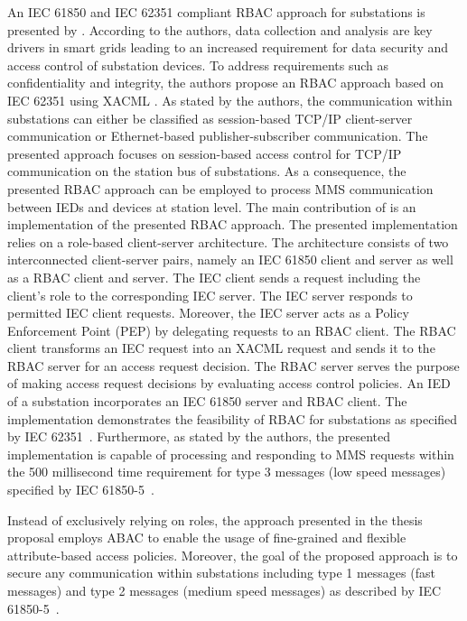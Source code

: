 An IEC 61850 and IEC 62351 compliant RBAC approach for substations is presented by \citeauthor{Lee2015} \cite{Lee2015}.
According to the authors, data collection and analysis are key drivers in smart grids leading to an increased requirement for data security and access control of substation devices.
To address requirements such as confidentiality and integrity, the authors propose an RBAC approach based on IEC 62351 \cite{IEC62351P8} using XACML \cite{Oasis2013}.
As stated by the authors, the communication within substations can either be classified as session-based TCP/IP client-server communication or Ethernet-based publisher-subscriber communication.
The presented approach focuses on session-based access control for TCP/IP communication on the station bus of substations.
As a consequence, the presented RBAC approach can be employed to process MMS communication between IEDs and devices at station level.
The main contribution of \citeauthor{Lee2015} is an implementation of the presented RBAC approach.
The presented implementation relies on a role-based client-server architecture.
The architecture consists of two interconnected client-server pairs, namely an IEC 61850 client and server as well as a RBAC client and server.
The IEC client sends a request including the client's role to the corresponding IEC server.
The IEC server responds to permitted IEC client requests.
Moreover, the IEC server acts as a Policy Enforcement Point (PEP) by delegating requests to an RBAC client.
The RBAC client transforms an IEC request into an XACML request and sends it to the RBAC server for an access request decision.
The RBAC server serves the purpose of making access request decisions by evaluating access control policies.
An IED of a substation incorporates an IEC 61850 server and RBAC client.
The implementation demonstrates the feasibility of RBAC for substations as specified by IEC 62351~\cite{IEC62351P8}.
Furthermore, as stated by the authors, the presented implementation is capable of processing and responding to MMS requests within the 500 millisecond time requirement for type 3 messages (low speed messages) specified by IEC 61850-5~\cite{IEC61850P5}.

Instead of exclusively relying on roles, the approach presented in the thesis proposal employs ABAC to enable the usage of fine-grained and flexible attribute-based access policies.
Moreover, the goal of the proposed approach is to secure any communication within substations including type 1 messages (fast messages) and type 2 messages (medium speed messages) as described by IEC 61850-5~\cite{IEC61850P5}.

